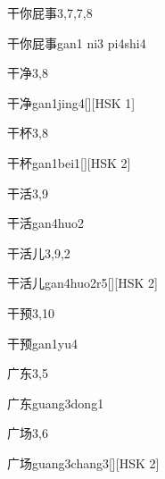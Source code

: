 \begin{entry}{干你屁事}{3,7,7,8}
  \begin{phonetics}{干你屁事}{gan1 ni3 pi4shi4}
  \end{phonetics}
\end{entry}

\begin{entry}{干净}{3,8}
  \begin{phonetics}{干净}{gan1jing4}[][HSK 1]
  \end{phonetics}
\end{entry}

\begin{entry}{干杯}{3,8}
  \begin{phonetics}{干杯}{gan1bei1}[][HSK 2]
  \end{phonetics}
\end{entry}

\begin{entry}{干活}{3,9}
  \begin{phonetics}{干活}{gan4huo2}
  \end{phonetics}
\end{entry}

\begin{entry}{干活儿}{3,9,2}
  \begin{phonetics}{干活儿}{gan4huo2r5}[][HSK 2]
  \end{phonetics}
\end{entry}

\begin{entry}{干预}{3,10}
  \begin{phonetics}{干预}{gan1yu4}
  \end{phonetics}
\end{entry}

\begin{entry}{广东}{3,5}
  \begin{phonetics}{广东}{guang3dong1}
  \end{phonetics}
\end{entry}

\begin{entry}{广场}{3,6}
  \begin{phonetics}{广场}{guang3chang3}[][HSK 2]
  \end{phonetics}
\end{entry}


